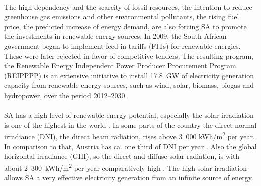 \documentclass[Master,MEE,english]{twbook}%
\begin{document}
\\
The high dependency and the scarcity of fossil resources, the intention to reduce greenhouse gas emissions and other environmental pollutants, the rising fuel price, the predicted increase of energy demand, are also forcing SA to promote the investments in renewable energy sources. In 2009, the South African government began to implement feed-in tariffs (FITs) for renewable energies. These were later rejected in favor of competitive tenders. The resulting program, the Renewable Energy Independent Power Producer Procurement Program (REIPPPP) is an extensive initiative to install 17.8~GW of electricity generation capacity from renewable energy sources, such as wind, solar, biomass, biogas and hydropower, over the period 2012–2030. \cite{DEA2015,DoE2013,Eberhard2014}\\
\\
SA has a high level of renewable energy potential, especially the solar irradiation is one of the highest in the world \cite{IRENA2014}. In some parts of the country the direct normal irradiance (DNI),  the direct beam radiation, rises above 3~000 kWh/m\textsuperscript{2} per year. In comparison to that, Austria has ca. one third of DNI per year \cite{SolarGIS2013a,SolarGIS2013}. Also the global horizontal irradiance (GHI), so the direct and diffuse solar radiation, is with about 2~300~kWh/m\textsuperscript{2} per year comparatively high \cite{SolarGIS2011}. The high solar irradiation allows SA a very effective electricity generation from an infinite source of energy.\\
\\
\end{document}
